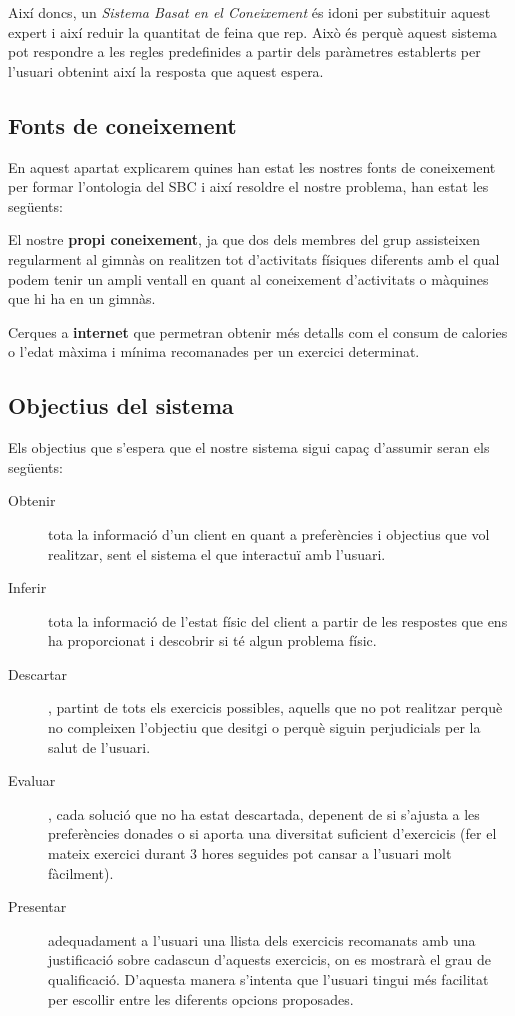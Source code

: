 \documentclass[a4paper, 12pt, UTF8]{article}
\begin{document}
Així doncs, un \emph{Sistema Basat en el Coneixement} és idoni per substituir aquest expert i així reduir la quantitat de feina que rep. Això és perquè aquest sistema pot respondre a les regles predefinides a partir dels paràmetres establerts per l'usuari obtenint així la resposta que aquest espera.

\subsection{Fonts de coneixement}

En aquest apartat explicarem quines han estat les nostres fonts de coneixement per formar l'ontologia del SBC i així resoldre el nostre problema, han estat les següents:

El nostre \textbf{propi coneixement}, ja que dos dels membres del grup assisteixen regularment al gimnàs on realitzen tot d'activitats físiques diferents amb el qual podem tenir un ampli ventall en quant al coneixement d'activitats o màquines que hi ha en un gimnàs.

Cerques a \textbf{internet} que permetran obtenir més detalls com el consum de calories o l'edat màxima i mínima recomanades per un exercici determinat.

\subsection{Objectius del sistema}

Els objectius que s'espera que el nostre sistema sigui capaç d'assumir seran els següents:

\begin{description}
	\item[Obtenir] tota la informació d'un client en quant a preferències i objectius que vol realitzar, sent el sistema el que interactuï amb l'usuari.
	\item[Inferir] tota la informació de l'estat físic del client a partir de les respostes que ens ha proporcionat i descobrir si té algun problema físic.
	\item[Descartar], partint de tots els exercicis possibles, aquells que no pot realitzar perquè no compleixen l'objectiu que desitgi o perquè siguin perjudicials per la salut de l'usuari.
	\item[Evaluar], cada solució que no ha estat descartada, depenent de si s'ajusta a les preferències donades o si aporta una diversitat suficient d'exercicis (fer el mateix exercici durant 3 hores seguides pot cansar a l'usuari molt fàcilment).
	\item[Presentar] adequadament a l'usuari una llista dels exercicis recomanats amb una justificació sobre cadascun d'aquests exercicis, on es mostrarà el grau de qualificació. D'aquesta manera s'intenta que l'usuari tingui més facilitat per escollir entre les diferents opcions proposades.
\end{description}
\end{document}
